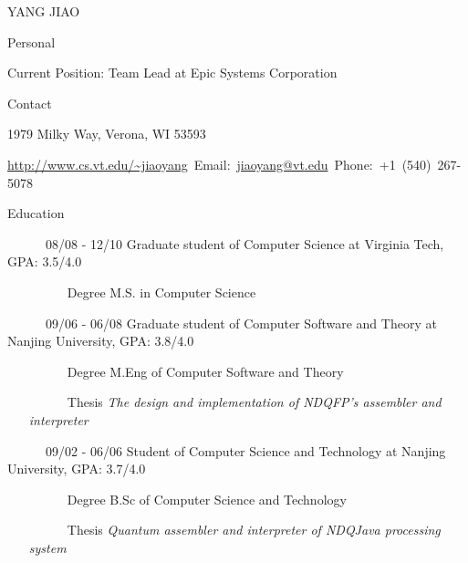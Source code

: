 \documentclass{article}
\begin{document}
\begin{cv}{YANG JIAO}
\begin{cvlist}{Personal}
\item Current Position: Team Lead at Epic Systems Corporation
\end{cvlist}
\begin{cvlist}{Contact}
\item 1979 Milky Way, Verona, WI 53593  
\item \url{http://www.cs.vt.edu/~jiaoyang}~Email:~\url{jiaoyang@vt.edu}~Phone:~+1~(540)~267-5078
\end{cvlist}
\begin{cvlist}{Education}
\item [~~~~~~08/08 - 12/10] Graduate student of Computer Science at Virginia Tech, GPA: 3.5/4.0
\begin{itemize}
\item [~~~~~~Degree] M.S. in Computer Science 
\end{itemize}
\item [~~~~~~09/06 - 06/08] Graduate student of Computer Software and Theory at Nanjing University, GPA: 3.8/4.0
\begin{itemize}
\item [~~~~~~Degree] M.Eng of Computer Software and Theory
\item [~~~~~~Thesis] {\em The design and implementation of NDQFP's assembler and interpreter}
\end{itemize}
\item [~~~~~~09/02 - 06/06] Student of Computer Science and Technology at Nanjing University, GPA: 3.7/4.0
\begin{itemize}
\item [~~~~~~Degree] B.Sc of Computer Science and Technology
\item [~~~~~~Thesis] {\em Quantum assembler and interpreter of NDQJava processing system}
\end{itemize}
\end{cvlist}


\end{cv}
\end{document}
